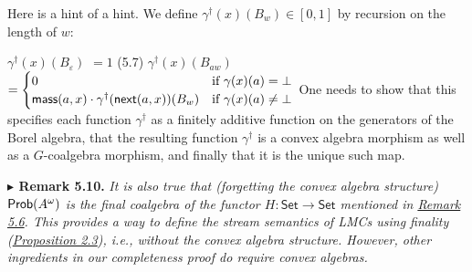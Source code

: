 \par\medskip
\hypertarget{html:S5.SS0.SSS0.Px1.SPx1.p3}{} Here is a hint of a hint. We define %
\hypertarget{html:S5.SS0.SSS0.Px1.SPx1.p3.m1}{}\({\gamma^{{\dagger}}(x)(B_{w})\in[0,1]}\) by recursion on the length of %
\hypertarget{html:S5.SS0.SSS0.Px1.SPx1.p3.m2}{}\({w}\):
\par\medskip
\hypertarget{html:S5.E7}{}  %
\hypertarget{html:S5.E7X}{}  %
\hypertarget{html:S5.E7X.m2}{}\({\displaystyle\gamma^{{\dagger}}(x)(B_{\varepsilon})}\) %
\hypertarget{html:S5.E7X.m3}{}\({\displaystyle=1}\)  (5.7)  %
\hypertarget{html:S5.E7Xa}{}  %
\hypertarget{html:S5.E7Xa.m2}{}\({\displaystyle\gamma^{\dagger}(x)(B_{aw})}\) %
\hypertarget{html:S5.E7Xa.m3}{}\({\displaystyle=\begin{cases}0&\text{if $\gamma(x)(a)=\bot$}\\
\mbox{\sf mass}(a,x)\cdot\gamma^{\dagger}(\mbox{\sf next}(a,x))(B_{w})&\text{if $\gamma(x)(a)\neq\bot$}\end{cases}}\)     One needs to show that this specifies each function %
\hypertarget{html:S5.SS0.SSS0.Px1.SPx1.p3.m3}{}\({\gamma^{{\dagger}}}\) as a finitely additive function on the generators of the Borel algebra, that the resulting function %
\hypertarget{html:S5.SS0.SSS0.Px1.SPx1.p3.m4}{}\({\gamma^{\dagger}}\) is a convex algebra morphism as well as a %
\hypertarget{html:S5.SS0.SSS0.Px1.SPx1.p3.m5}{}\({G}\)-coalgebra morphism, and finally that it is the unique such map.
\par\medskip
\hypertarget{html:S5.Thmtheorem10}{} \par\noindent\textbf{%
\hypertarget{html:S5.Thmtheorem10.m1}{}\({\blacktriangleright}\) Remark 5.10.}\quad  %
\hypertarget{html:S5.Thmtheorem10.p1}{} \emph{It is also true that (forgetting the convex algebra structure) %
\hypertarget{html:S5.Thmtheorem10.p1.m1}{}\({\text{\sf Prob}(A^{\omega})}\) is the final coalgebra of the functor %
\hypertarget{html:S5.Thmtheorem10.p1.m2}{}\({H:\mathsf{Set}\to\mathsf{Set}}\) mentioned in \hyperlink{html:S5.Thmtheorem6}{Remark 5.6}. This provides a way to define the stream semantics of LMCs using finality (\hyperlink{html:S2.Thmtheorem3}{Proposition 2.3}), i.e., without the convex algebra structure. However, other ingredients in our completeness proof do require convex algebras.}
